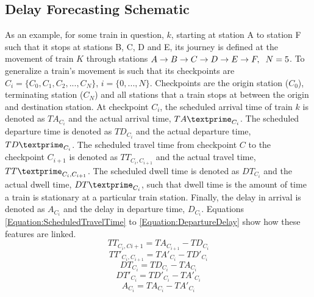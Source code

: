 \documentclass[]{interact}
\theoremstyle{plain}%
\theoremstyle{definition}
\theoremstyle{remark}
\begin{document}
\subsection{Delay Forecasting Schematic}\label{subsection:delay_forecasting_schematic}
As an example, for some train in question, $k$, starting at station A to station F such that it stops at stations B, C, D and E, its journey is defined at the movement of train $K$ through stations $A \rightarrow B \rightarrow C \rightarrow D \rightarrow E \rightarrow F, \hspace{0.2 cm}N = 5$. To generalize a train's movement is such that its checkpoints are  $C_i = \{C_{0}, C_{1}, C_{2}, ... , C_N\}$, $i=\{0,...,N\}$. Checkpoints are the origin station ($C_0$), terminating station ($C_N$) and all stations that a train stops at between the origin and destination station. At checkpoint $C_i$, the scheduled arrival time of train $k$ is denoted as $TA_{C_i}$ and the actual arrival time, $TA\textprime_{C_i}$. The scheduled departure time is denoted as $TD_{C_i}$ and the actual departure time, $TD\textprime_{C_i}$. The scheduled travel time from checkpoint $C$ to the checkpoint $C_{i+1}$ is denoted as $TT_{C_i,C_{i+1}}$ and the actual travel time, $TT\textprime_{C_i,C_{i+1}}$. The scheduled dwell time is denoted as $DT_{C_i}$ and the actual dwell time, $DT\textprime_{C_i}$, such that dwell time is the amount of time a train is stationary at a particular train station. Finally, the delay in arrival is denoted as $A_{C_i}$ and the delay in departure time, $D_{C_i}$. Equations \ref{Equation:ScheduledTravelTime} to \ref{Equation:DepartureDelay} show how these features are linked.
\begin{equation}
    TT_{C_i,C{i+1}}=TA_{C_{i+1}}-TD_{C_i}
\label{Equation:ScheduledTravelTime}
\end{equation}
\begin{equation}
    TT\prime_{C_i,C_{i+1}}=TA\prime_{C_i}-TD\prime_{C_i}
\label{Equation:ActualTravelTime}
\end{equation}
\begin{equation}
    DT_{C_i}=TD_{C_i}-TA_{C_i}
\label{Equation:ScheduledDwellTime}
\end{equation}
\begin{equation}
    DT\prime_{C_i}=TD\prime_{C_i}-TA\prime_{C_i}
\label{Equation:ActualDwellTime}
\end{equation}
\begin{equation}
    A_{C_i}=TA_{C_i}-TA\prime_{C_i}
\label{Equation:ArrivalDelay}
\end{equation}
\end{document}
